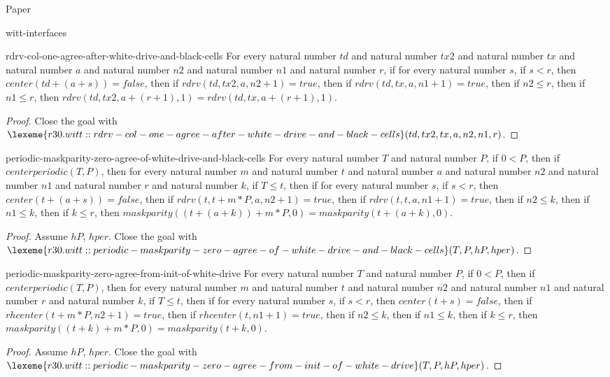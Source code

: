 \begin{lexlean}{Paper}
\begin{section}{witt-interfaces}
  \begin{theorem}{rdrv-col-one-agree-after-white-drive-and-black-cells}
  For every natural number \(td\) and natural number \(tx2\) and natural number \(tx\) and natural number \(a\) and natural number \(n2\) and natural number \(n1\) and natural number \(r\), if for every natural number \(s\), if \(s < r\), then \(center(td + (a + s)) = false\), then if \(rdrv(td, tx2, a, n2 + 1) = true\), then if \(rdrv(td, tx, a, n1 + 1) = true\), then if \(n2 ≤ r\), then if \(n1 ≤ r\), then \(rdrv(td, tx2, a + (r + 1), 1) = rdrv(td, tx, a + (r + 1), 1)\).
  \begin{proof}
  Close the goal with \(\lexeme{r30.witt::rdrv-col-one-agree-after-white-drive-and-black-cells}(td, tx2, tx, a, n2, n1, r)\).
  \end{proof}
  \end{theorem}

  \begin{theorem}{periodic-maskparity-zero-agree-of-white-drive-and-black-cells}
  For every natural number \(T\) and natural number \(P\), if \(0 < P\), then if \(centerperiodic(T, P)\), then for every natural number \(m\) and natural number \(t\) and natural number \(a\) and natural number \(n2\) and natural number \(n1\) and natural number \(r\) and natural number \(k\), if \(T ≤ t\), then if for every natural number \(s\), if \(s < r\), then \(center(t + (a + s)) = false\), then if \(rdrv(t, t + m * P, a, n2 + 1) = true\), then if \(rdrv(t, t, a, n1 + 1) = true\), then if \(n2 ≤ k\), then if \(n1 ≤ k\), then if \(k ≤ r\), then \(maskparity((t + (a + k)) + m * P, 0) = maskparity(t + (a + k), 0)\).
  \begin{proof}
  Assume \(hP\), \(hper\).
  Close the goal with \(\lexeme{r30.witt::periodic-maskparity-zero-agree-of-white-drive-and-black-cells}(T, P, hP, hper)\).
  \end{proof}
  \end{theorem}

  \begin{theorem}{periodic-maskparity-zero-agree-from-init-of-white-drive}
  For every natural number \(T\) and natural number \(P\), if \(0 < P\), then if \(centerperiodic(T, P)\), then for every natural number \(m\) and natural number \(t\) and natural number \(n2\) and natural number \(n1\) and natural number \(r\) and natural number \(k\), if \(T ≤ t\), then if for every natural number \(s\), if \(s < r\), then \(center(t + s) = false\), then if \(rhcenter(t + m * P, n2 + 1) = true\), then if \(rhcenter(t, n1 + 1) = true\), then if \(n2 ≤ k\), then if \(n1 ≤ k\), then if \(k ≤ r\), then \(maskparity((t + k) + m * P, 0) = maskparity(t + k, 0)\).
  \begin{proof}
  Assume \(hP\), \(hper\).
  Close the goal with \(\lexeme{r30.witt::periodic-maskparity-zero-agree-from-init-of-white-drive}(T, P, hP, hper)\).
  \end{proof}
  \end{theorem}


\end{section}
\end{lexlean}
